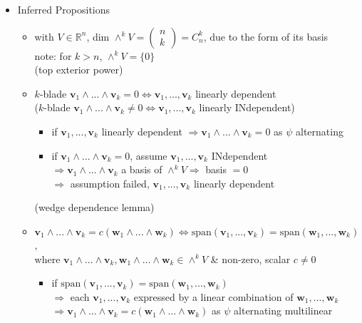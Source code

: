 \begin{itemize}
\begin{itemize}
	\item Inferred Propositions
		\begin{itemize}
		\item with $V\in\mathbb R^n$, dim $\wedge^kV=\left(\begin{smallmatrix} n \\ k \end{smallmatrix}\right) = C^k_n$, due to the form of its basis \\ 
		note: for $k > n$, $\wedge^kV=\{0\}$ \\
		(top exterior power)
		\item $k$-blade $\mathbf v_1\wedge...\wedge\mathbf v_k=0 \Leftrightarrow \mathbf v_1,...,\mathbf v_k$ linearly dependent \\
		($k$-blade $\mathbf v_1\wedge...\wedge\mathbf v_k \neq 0 \Leftrightarrow \mathbf v_1,...,\mathbf v_k$ linearly INdependent)
			\begin{itemize}
			\item if $\mathbf v_1,...,\mathbf v_k$ linearly dependent $\Rightarrow \mathbf v_1\wedge...\wedge\mathbf v_k=0$ as $\psi$ alternating
			\item if $\mathbf v_1\wedge...\wedge\mathbf v_k=0$, assume $\mathbf v_1,...,\mathbf v_k$ INdependent \\
			$\Rightarrow \mathbf v_1\wedge...\wedge\mathbf v_k$ a basis of $\wedge^kV \Rightarrow$ basis $=0$ \\
			$\Rightarrow$ assumption failed, $\mathbf v_1,...,\mathbf v_k$ linearly dependent
			\end{itemize}
			(wedge dependence lemma)
		\item $\mathbf v_1\wedge...\wedge \mathbf v_k = c(\mathbf w_1\wedge...\wedge \mathbf w_k) \Leftrightarrow \text{span}(\mathbf v_1, ..., \mathbf v_k)=\text{span}(\mathbf w_1, ..., \mathbf w_k)$, \\ 
		where $\mathbf v_1\wedge...\wedge \mathbf v_k, \mathbf w_1\wedge...\wedge\mathbf w_k\in\wedge^kV$ \& non-zero, scalar $c \neq 0$
			\begin{itemize}
			\item if $\text{span}(\mathbf v_1, ..., \mathbf v_k)=\text{span}(\mathbf w_1, ..., \mathbf w_k)$ \\
			$\Rightarrow$ each $\mathbf v_1, ..., \mathbf v_k$ expressed by a linear combination of $\mathbf w_1, ..., \mathbf w_k$ \\
			$\Rightarrow \mathbf v_1\wedge...\wedge \mathbf v_k = c(\mathbf w_1\wedge...\wedge \mathbf w_k)$ as $\psi$ alternating multilinear \\

\end{itemize}
\end{itemize}
\end{itemize}
\end{itemize}
